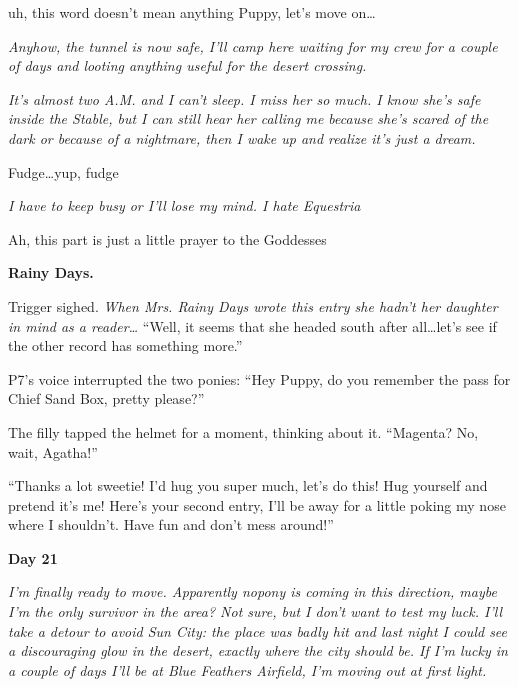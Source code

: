 \medskip

uh, this word doesn't mean anything Puppy, let's move on\dots

\medskip

\emph{Anyhow, the tunnel is now safe, I'll camp here waiting for my crew for a couple of days and looting anything useful for the desert crossing.}

\emph{It's almost two A.M. and I can't sleep. I miss her so much. I know she's safe inside the Stable, but I can still hear her calling me because she's scared of the dark or because of a nightmare, then I wake up and realize it's just a dream.}

\medskip

Fudge\dots yup, fudge

\medskip

\emph{I have to keep busy or I'll lose my mind. I hate Equestria}

\medskip

Ah, this part is just a little prayer to the Goddesses

\medskip

\begin{flushright}
\textbf{Rainy Days.}
\end{flushright}

\medskip

Trigger sighed. \emph{When Mrs. Rainy Days wrote this entry she hadn't her daughter in mind as a reader\dots} ``Well, it seems that she headed south after all\dots let's see if the other record has something more.''

P7's voice interrupted the two ponies: ``Hey Puppy, do you remember the pass for Chief Sand Box, pretty please?''

The filly tapped the helmet for a moment, thinking about it. ``Magenta? No, wait, Agatha!''

``Thanks a lot sweetie! I'd hug you super much, let's do this! Hug yourself and pretend it's me! Here's your second entry, I'll be away for a little poking my nose where I shouldn't. Have fun and don't mess around!''

\medskip

\begin{center}
    \textbf{Day 21}
\end{center}

\emph{I'm finally ready to move. Apparently nopony is coming in this direction, maybe I'm the only survivor in the area? Not sure, but I don't want to test my luck. I'll take a detour to avoid Sun City: the place was badly hit and last night I could see a discouraging glow in the desert, exactly where the city should be. If I'm lucky in a couple of days I'll be at Blue Feathers Airfield, I'm moving out at first light.}

